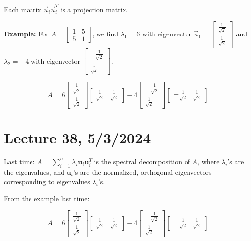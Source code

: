 \documentclass{article}
\begin{document}
Each matrix $\vec{u}_i \vec{u}_i^T$ is a projection matrix.

\textbf{Example:} For $A = \begin{bmatrix} 1 & 5 \\ 5 & 1 \end{bmatrix}$, we find $\lambda_1 = 6$ with eigenvector $\vec{u}_1 = \begin{bmatrix} \frac{1}{\sqrt{2}} \\ \frac{1}{\sqrt{2}} \end{bmatrix}$ and $\lambda_2 = -4$ with eigenvector $\begin{bmatrix} -\frac{1}{\sqrt{2}} \\ \frac{1}{\sqrt{2}} \end{bmatrix}$.

\[
A = 6 \begin{bmatrix} \frac{1}{\sqrt{2}} \\ \frac{1}{\sqrt{2}} \end{bmatrix} \begin{bmatrix} \frac{1}{\sqrt{2}} & \frac{1}{\sqrt{2}} \end{bmatrix} - 4 \begin{bmatrix} -\frac{1}{\sqrt{2}} \\ \frac{1}{\sqrt{2}} \end{bmatrix} \begin{bmatrix} -\frac{1}{\sqrt{2}} & \frac{1}{\sqrt{2}} \end{bmatrix}
\]


\section{Lecture 38, 5/3/2024}

Last time: $A = \sum_{i=1}^n \lambda_i \mathbf{u}_i \mathbf{u}_i^T$ is the spectral decomposition of $A$, where $\lambda_i$'s are the eigenvalues, and $\mathbf{u}_i$'s are the normalized, orthogonal eigenvectors corresponding to eigenvalues $\lambda_i$'s.

From the example last time:

\[
A = 6 \begin{bmatrix} \frac{1}{\sqrt{2}} \\ \frac{1}{\sqrt{2}} \end{bmatrix} \begin{bmatrix} \frac{1}{\sqrt{2}} & \frac{1}{\sqrt{2}} \end{bmatrix} - 4 \begin{bmatrix} -\frac{1}{\sqrt{2}} \\ \frac{1}{\sqrt{2}} \end{bmatrix} \begin{bmatrix} -\frac{1}{\sqrt{2}} & \frac{1}{\sqrt{2}} \end{bmatrix}
\]
\end{document}
